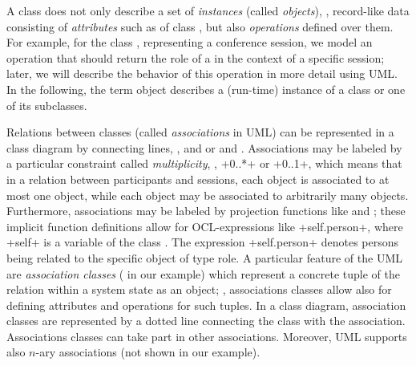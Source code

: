 A class does not only describe a set of \emph{instances} (called
\emph{objects}), \ie, record-like data consisting of \emph{attributes}
such as  of class , but also
\emph{operations} defined over them. For example, for the class
, representing a conference session, we model an
operation  that should return the
role of a  in the context of a specific session;
later, we will describe the behavior of this operation in more detail
using UML\@. In the following, the term object describes a
(run-time) instance of a class or one of its subclasses.

Relations between classes (called \emph{associations} in UML)
can be represented in a class diagram by connecting lines, \eg,
 and  or 
and . Associations may be labeled by a particular
constraint called \emph{multiplicity}, \eg, \inlineocl+0..*+ or
\inlineocl+0..1+, which means that in a relation between participants
and sessions, each  object is associated to at
most one  object, while each 
object may be associated to arbitrarily many 
objects. Furthermore, associations may be labeled by projection
functions like  and ; these implicit
function definitions allow for OCL-expressions like
\inlineocl+self.person+, where \inlineocl+self+ is a variable of the
class . The expression \inlineocl+self.person+ denotes
persons being related to the specific object  of
type role. A particular feature of the UML are \emph{association
  classes} ( in our example) which represent a
concrete tuple of the relation within a system state as an object;
\ie, associations classes allow also for defining attributes and
operations for such tuples. In a class diagram, association classes
are represented by a dotted line connecting the class with the
association. Associations classes can take part in other associations.
Moreover, UML supports also $n$-ary associations (not shown in
our example).


